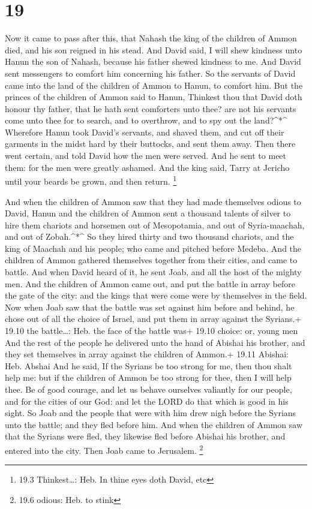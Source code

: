 \hypertarget{section-18}{%
\section{19}\label{section-18}}

 Now it came to pass after this, that Nahash the king of the
children of Ammon died, and his son reigned in his stead. 
And David said, I will shew kindness unto Hanun the son of Nahash,
because his father shewed kindness to me. And David sent messengers to
comfort him concerning his father. So the servants of David came into
the land of the children of Ammon to Hanun, to comfort him. 
But the princes of the children of Ammon said to Hanun, Thinkest thou
that David doth honour thy father, that he hath sent comforters unto
thee? are not his servants come unto thee for to search, and to
overthrow, and to spy out the land?\^{}*\^{}  Wherefore
Hanun took David's servants, and shaved them, and cut off their garments
in the midst hard by their buttocks, and sent them away. 
Then there went certain, and told David how the men were served. And he
sent to meet them: for the men were greatly ashamed. And the king said,
Tarry at Jericho until your beards be grown, and then return.
\footnote{19.3 Thinkest\ldots: Heb. In thine eyes doth David, etc}

 And when the children of Ammon saw that they had made
themselves odious to David, Hanun and the children of Ammon sent a
thousand talents of silver to hire them chariots and horsemen out of
Mesopotamia, and out of Syria-maachah, and out of Zobah.\^{}*\^{}
 So they hired thirty and two thousand chariots, and the
king of Maachah and his people; who came and pitched before Medeba. And
the children of Ammon gathered themselves together from their cities,
and came to battle.  And when David heard of it, he sent
Joab, and all the host of the mighty men.  And the children
of Ammon came out, and put the battle in array before the gate of the
city: and the kings that were come were by themselves in the field.
 Now when Joab saw that the battle was set against him
before and behind, he chose out of all the choice of Israel, and put
them in array against the Syrians.+ 19.10 the battle\ldots: Heb. the
face of the battle was+ 19.10 choice: or, young men  And
the rest of the people he delivered unto the hand of Abishai his
brother, and they set themselves in array against the children of
Ammon.+ 19.11 Abishai: Heb. Abshai  And he said, If the
Syrians be too strong for me, then thou shalt help me: but if the
children of Ammon be too strong for thee, then I will help thee.
 Be of good courage, and let us behave ourselves valiantly
for our people, and for the cities of our God: and let the LORD do that
which is good in his sight.  So Joab and the people that
were with him drew nigh before the Syrians unto the battle; and they
fled before him.  And when the children of Ammon saw that
the Syrians were fled, they likewise fled before Abishai his brother,
and entered into the city. Then Joab came to Jerusalem. \footnote{19.6
  odious: Heb. to stink}

